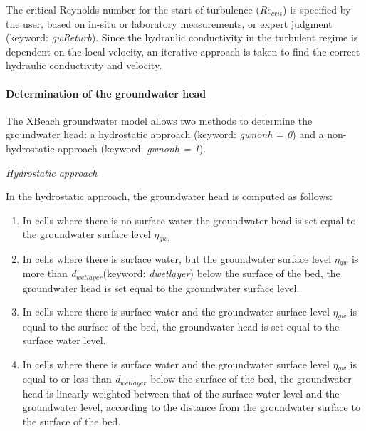 \documentclass{article}
\begin{document}
\noindent 

\noindent The critical Reynolds number for the start of turbulence (\textit{Re${}_{crit}$}) is specified by the user, based on in-situ or laboratory measurements, or expert judgment (keyword: \textit{gwReturb}). Since the hydraulic conductivity in the turbulent regime is dependent on the local velocity, an iterative approach is taken to find the correct hydraulic conductivity and velocity. 


\paragraph{ Determination of the groundwater head}

\noindent The XBeach groundwater model allows two methods to determine the groundwater head: a hydrostatic approach (keyword: \textit{gwnonh = 0}) and a non-hydrostatic approach (keyword: \textit{gwnonh = 1}).

\noindent 

\noindent \textit{Hydrostatic approach}

\noindent In the hydrostatic approach, the groundwater head is computed as follows:

\noindent 

\begin{enumerate}
\item  In cells where there is no surface water the groundwater head is set equal to the groundwater surface level \textit{$\eta $${}_{gw.}$}

\item  In cells where there is surface water, but the groundwater surface level \textit{$\eta $${}_{gw}$} is more than \textit{d${}_{wetlayer }$}(keyword: \textit{dwetlayer}) below the surface of the bed, the groundwater head is set equal to the groundwater surface level.

\item  In cells where there is surface water and the groundwater surface level \textit{$\eta $${}_{gw}$} is equal to the surface of the bed, the groundwater head is set equal to the surface water level.

\item  In cells where there is surface water and the groundwater surface level \textit{$\eta $${}_{gw}$} is equal to or less than \textit{d${}_{wetlayer}$} below the surface of the bed, the groundwater head is linearly weighted between that of the surface water level and the groundwater level, according to the distance from the groundwater surface to the surface of the bed. 
\end{enumerate}
\end{document}
